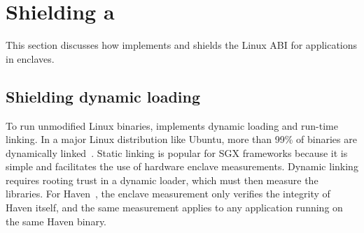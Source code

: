 \section{Shielding a \Libos{}}
\label{sec:sgx:shield}


This section discusses how \graphenesgx{}
implements and shields the Linux ABI for applications in enclaves.




\subsection{Shielding dynamic loading}
\label{sec:sgx:shield:linking}


To run unmodified Linux binaries,
\graphenesgx{} implements dynamic loading and run-time linking.
In a major Linux distribution like Ubuntu, more than 99\% of binaries are dynamically linked~\cite{tsai16apistudy}.
Static linking is popular for SGX frameworks because it is simple and 
facilitates the use of hardware enclave measurements. %
Dynamic linking requires rooting trust in a dynamic loader, which must then measure the libraries.
For Haven~\cite{baumann14haven}, the enclave measurement only verifies the integrity of Haven itself,
and the same measurement
applies to any application running on the same Haven binary.



